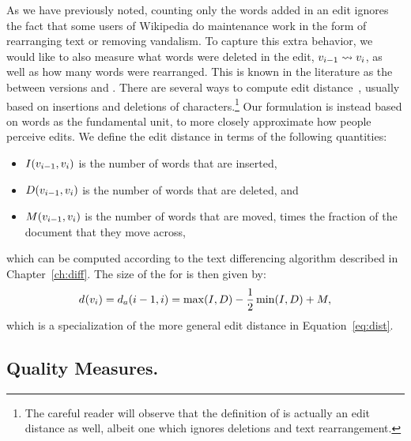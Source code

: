 As we have previously noted, counting only the words added in
an edit ignores the fact that some users of Wikipedia do maintenance
work in the form of rearranging text or removing vandalism.
To capture this extra behavior, we would like to also measure
what words were deleted in the edit, $v_{i-1} \rightsquigarrow v_{i}$,
as well as how many words were rearranged.
This is known in the literature as the  between
versions  and .
There are several ways to compute edit
distance~\cite{Levenshtein1966,Tichy1984},
usually based on insertions and deletions of
characters.\footnote{The careful reader will observe that
the definition of  is actually an
edit distance as well, albeit one which ignores deletions
and text rearrangement.}
Our formulation is instead based on words as the fundamental unit,
to more closely approximate how people perceive edits.
We define the edit distance in terms of the following quantities:
\begin{itemize}
\item $I(v_{i-1}, v_{i})$ is the number of words that are inserted,
\item $D(v_{i-1}, v_{i})$ is the number of words that are deleted,
    and
\item $M(v_{i-1}, v_{i})$ is the number of words that are moved,
    times the fraction of the document that they move across,
\end{itemize}
which can be computed according to the text differencing
algorithm described in Chapter~\ref{ch:diff}.
The size of the  for  is
then given by:
%
\begin{equation*}
d_{}(v_{i}) = d_{a}(i-1,i) = \max(I, D)
    - \frac{1}{2}\min(I, D) + M,
\end{equation*}
which is a specialization of the more general
edit distance in Equation~\ref{eq:dist}.



\subsection{Quality Measures.}

